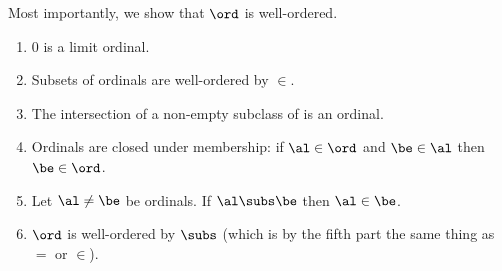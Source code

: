 \begin{prop}
    Most importantly, we show that $\ord$ is well-ordered.
    \begin{enumerate}
        \item $0$ is a limit ordinal.
        \item Subsets of ordinals are well-ordered by $\in$.
        \item The intersection of a non-empty subclass of is an ordinal.
        \item Ordinals are closed under membership: if $\al \in \ord$
            and $\be \in \al$ then $\be \in \ord$.
        \item Let $\al \ne \be$ be ordinals. 
            If $\al \subs \be$ then $\al \in \be$.
        \item $\ord$ is well-ordered by $\subs$
        (which is by the fifth part the same thing as $=$ or $\in$).
    \end{enumerate}
\end{prop}
